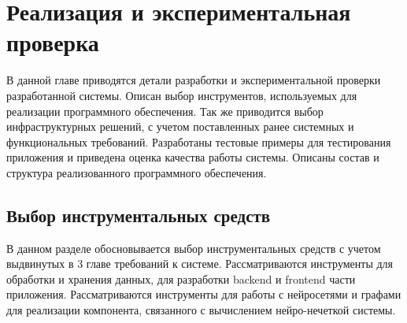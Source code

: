 \chapter{Реализация и экспериментальная проверка}

\begin{annotation}
	В данной главе приводятся детали разработки и экспериментальной проверки
	разработанной системы. Описан выбор инструментов, используемых для реализации
	программного обеспечения. Так же приводится выбор инфраструктурных решений,
	с учетом поставленных ранее системных и функциональных требований.
	Разработаны тестовые примеры для тестирования приложения
	и приведена оценка качества работы системы. Описаны состав и структура
	реализованного программного обеспечения.
\end{annotation}




\section{Выбор инструментальных средств}
\begin{annotation}
	В данном разделе обосновывается выбор инструментальных средств с учетом выдвинутых в 3
	главе требований к системе. Рассматриваются инструменты для обработки и хранения данных,
	для разработки backend и frontend части приложения. Рассматриваются инструменты для работы
	с нейросетями и графами для реализации компонента, связанного с вычислением нейро-нечеткой системы.
\end{annotation}


